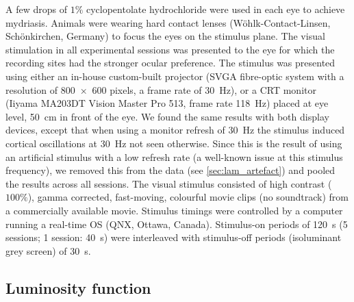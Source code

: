 A few drops of $1\%$ cyclopentolate hydrochloride were used in each eye to achieve mydriasis.
Animals were wearing hard contact lenses (W\"ohlk-Contact-Linsen, Sch\"onkirchen, Germany) to focus the eyes on the stimulus plane.
The visual stimulation in all experimental sessions was presented to the eye for which the recording sites had the stronger ocular preference.
The stimulus was presented using either an in-house custom-built projector (SVGA fibre-optic system with a resolution of \num{800x600} pixels, a frame rate of \SI{30}{Hz}), or a \ac{CRT} monitor (Iiyama MA203DT Vision Master Pro 513, frame rate \SI{118}{Hz}) placed at eye level, \SI{50}{\centi\metre} in front of the eye.
We found the same results with both display devices, except that when using a monitor refresh of \SI{30}{Hz} the stimulus induced cortical oscillations at \SI{30}{Hz} not seen otherwise.
Since this is the result of using an artificial stimulus with a low refresh rate (a well-known issue at this stimulus frequency), we removed this from the data (see \autoref{sec:lam_artefact}) and pooled the results across all sessions.
The visual stimulus consisted of high contrast ($100\%$), gamma corrected, fast-moving, colourful movie clips (no soundtrack) from a commercially available movie.
Stimulus timings were controlled by a computer running a real-time OS (QNX, Ottawa, Canada).
Stimulus-on periods of \SI{120}{\second} (\num{5} sessions; \num{1} session: \SI{40}{\second}) were interleaved with stimulus-off periods (isoluminant grey screen) of \SI{30}{\second}.


\subsection{Luminosity function}
\label{sec:lam_lumos}


